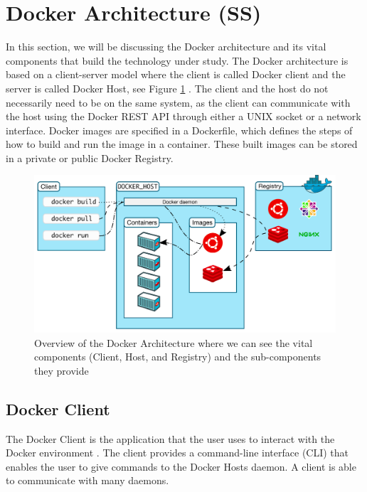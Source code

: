 \documentclass[fleqn,12pt]{olplainarticle}
\begin{document}
\section{Docker Architecture (SS)}

In this section, we will be discussing the Docker architecture and its vital components that build the technology under study. The Docker architecture is based on a client-server model where the client is called Docker client and the server is called Docker Host, see Figure \ref{fig:overview} \citep{docker:overview, aquasec:docker_architecture}. The client and the host do not necessarily need to be on the same system, as the client can communicate with the host using the Docker REST API through either a UNIX socket or a network interface. Docker images are specified in a Dockerfile, which defines the steps of how to build and run the image in a container. These built images can be stored in a private or public Docker Registry.

\begin{figure}[h]
    \centering
    \includegraphics[width=1\textwidth]{docker-overview}
    \caption{Overview of the Docker Architecture where we can see the vital components (Client, Host, and Registry) and the sub-components they provide \citep{docker:overview}}
    \label{fig:overview}
\end{figure}

\subsection{Docker Client}

The Docker Client is the application that the user uses to interact with the Docker environment \citep{aquasec:docker_architecture}. The client provides a command-line interface (CLI) that enables the user to give commands to the Docker Hosts daemon. A client is able to communicate with many daemons.
\end{document}
